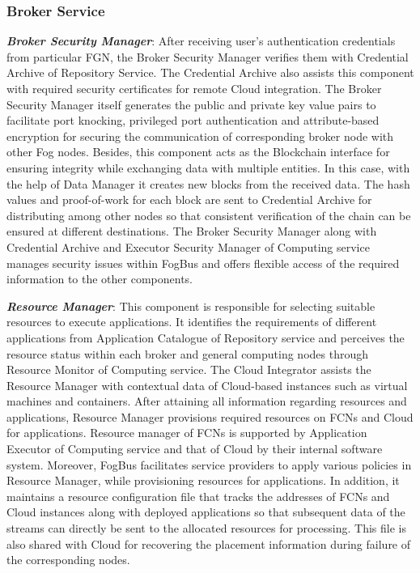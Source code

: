 \documentclass[final,5p,times,twocolumn]{elsarticle}
\begin{document}
\subsubsection{Broker Service}
\textbf{\textit{Broker Security Manager}}: After receiving user's authentication credentials from particular FGN, the Broker Security Manager verifies them with Credential Archive of Repository Service. The Credential Archive also assists this component with required security certificates for remote Cloud integration. The Broker Security Manager itself generates the public and private key value pairs to facilitate port knocking, privileged port authentication and attribute-based encryption for securing the communication of corresponding broker node with other Fog nodes. Besides, this component acts as the Blockchain interface for ensuring integrity while exchanging data with multiple entities. In this case, with the help of Data Manager it creates new blocks from the received data. The hash values and proof-of-work for each block are sent to Credential Archive for distributing among other nodes so that consistent verification of the chain can be ensured at different destinations. The Broker Security Manager along with Credential Archive and Executor Security Manager of Computing service manages security issues within FogBus and offers flexible access of the required information to the other components.       
%
\par \textbf{\textit{Resource Manager}}: This component is responsible for selecting suitable resources to execute applications. It identifies the requirements of different applications from Application Catalogue of Repository service and perceives the resource status within each broker and general computing nodes through Resource Monitor of Computing service. The Cloud Integrator assists the Resource Manager with contextual data of Cloud-based instances such as virtual machines and containers. After attaining all information regarding resources and applications, Resource Manager provisions required resources on FCNs and Cloud for applications. Resource manager of FCNs is supported by Application Executor of Computing service and that of Cloud by their internal software system. Moreover, FogBus facilitates service providers to apply various policies in Resource Manager, while provisioning resources for applications. In addition, it maintains a resource configuration file that tracks the addresses of FCNs and Cloud instances along with deployed applications so that subsequent data of the streams can directly be sent to the allocated resources for processing. This file is also shared with Cloud for recovering the placement information during failure of the corresponding nodes. 
\end{document}

